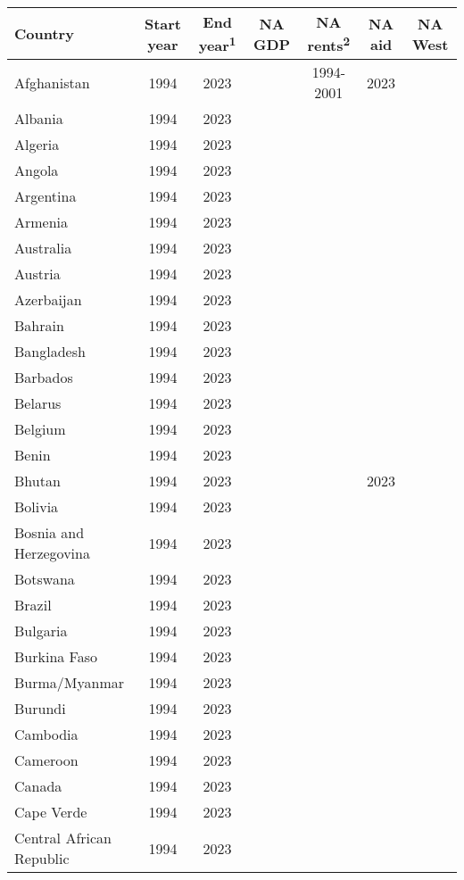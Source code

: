 {\fontsize{8pt}{8pt}\selectfont\tabcolsep=2pt\centering  %
\begin{longtable}{lcccccc}
\toprule
Country & Start year & End year\textsuperscript{1} & NA GDP & NA rents\textsuperscript{2} & NA aid & NA West\\
\midrule
Afghanistan & 1994 & 2023 &  & 1994-2001 & 2023 & \\
Albania & 1994 & 2023 &  &  &  & \\
Algeria & 1994 & 2023 &  &  &  & \\
Angola & 1994 & 2023 &  &  &  & \\
Argentina & 1994 & 2023 &  &  &  & \\
\addlinespace
Armenia & 1994 & 2023 &  &  &  & \\
Australia & 1994 & 2023 &  &  &  & \\
Austria & 1994 & 2023 &  &  &  & \\
Azerbaijan & 1994 & 2023 &  &  &  & \\
Bahrain & 1994 & 2023 &  &  &  & \\
\addlinespace
Bangladesh & 1994 & 2023 &  &  &  & \\
Barbados & 1994 & 2023 &  &  &  & \\
Belarus & 1994 & 2023 &  &  &  & \\
Belgium & 1994 & 2023 &  &  &  & \\
Benin & 1994 & 2023 &  &  &  & \\
\addlinespace
Bhutan & 1994 & 2023 &  &  & 2023 & \\
Bolivia & 1994 & 2023 &  &  &  & \\
Bosnia and Herzegovina & 1994 & 2023 &  &  &  & \\
Botswana & 1994 & 2023 &  &  &  & \\
Brazil & 1994 & 2023 &  &  &  & \\
\addlinespace
Bulgaria & 1994 & 2023 &  &  &  & \\
Burkina Faso & 1994 & 2023 &  &  &  & \\
Burma/Myanmar & 1994 & 2023 &  &  &  & \\
Burundi & 1994 & 2023 &  &  &  & \\
Cambodia & 1994 & 2023 &  &  &  & \\
\addlinespace
Cameroon & 1994 & 2023 &  &  &  & \\
Canada & 1994 & 2023 &  &  &  & \\
Cape Verde & 1994 & 2023 &  &  &  & \\
Central African Republic & 1994 & 2023 &  &  &  & \\

\end{longtable}}
